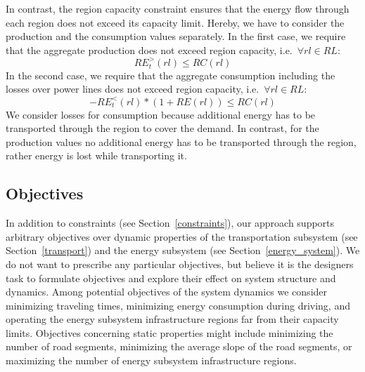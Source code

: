 In contrast, the region capacity constraint ensures that the energy flow through each region does not exceed its capacity limit. Hereby, we have to consider the production and the consumption values separately. In the first case, we require that the aggregate production does not exceed region capacity, i.e.\ $\forall rl \in RL:$
\[
	RE_t^>(rl) \leq RC(rl)
\]
In the second case, we require that the aggregate consumption including the losses over power lines does not exceed region capacity, i.e.\ $\forall rl \in RL:$
\[
	- RE_t^<(rl) * (1 + RE(rl)) \leq RC(rl)
\]
We consider losses for consumption because additional energy has to be transported through the region to cover the demand. In contrast, for the production values no additional energy has to be transported through the region, rather energy is lost while transporting it.

\subsection{Objectives}
\label{objectives}
In addition to constraints (see Section~\ref{constraints}), our approach supports arbitrary objectives over dynamic properties of the transportation subsystem (see Section~\ref{transport}) and the energy subsystem (see Section~\ref{energy_system}). We do not want to prescribe any particular objectives, but believe it is the designers task to formulate objectives and explore their effect on system structure and dynamics. Among potential objectives of the system dynamics we consider minimizing traveling times, minimizing energy consumption during driving, and operating the energy subsystem infrastructure regions far from their capacity limits. 
Objectives concerning static properties might include minimizing the number of road segments, minimizing the average slope of the road segments, or maximizing the number of energy subsystem infrastructure regions.